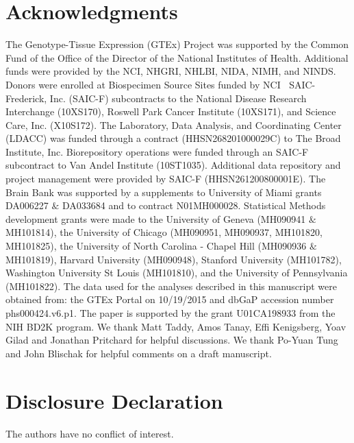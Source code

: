 \documentclass[10pt,letterpaper]{article}
\begin{document}
\section*{Acknowledgments}
The Genotype-Tissue Expression (GTEx) Project was supported by the Common Fund of the Office of the Director of the National Institutes of Health. Additional funds were provided by the NCI, NHGRI, NHLBI, NIDA, NIMH, and NINDS. Donors were enrolled at Biospecimen Source Sites funded by NCI $\ $ SAIC-Frederick, Inc. (SAIC-F) subcontracts to the National Disease Research Interchange (10XS170), Roswell Park Cancer Institute (10XS171), and Science Care, Inc. (X10S172). The Laboratory, Data Analysis, and Coordinating Center (LDACC) was funded through a contract (HHSN268201000029C) to The Broad Institute, Inc. Biorepository operations were funded through an SAIC-F subcontract to Van Andel Institute (10ST1035). Additional data repository and project management were provided by SAIC-F (HHSN261200800001E). The Brain Bank was supported by a supplements to University of Miami grants DA006227 $\&$ DA033684 and to contract N01MH000028. Statistical Methods development grants were made to the University of Geneva (MH090941 $\&$ MH101814), the University of Chicago (MH090951, MH090937, MH101820, MH101825), the University of North Carolina - Chapel Hill (MH090936 $\&$ MH101819), Harvard University (MH090948), Stanford University (MH101782), Washington University St Louis (MH101810), and the University of Pennsylvania (MH101822). The data used for the analyses described in this manuscript were obtained from: the GTEx Portal on 10/19/2015 and  dbGaP accession number phs000424.v6.p1.
The paper is supported by the grant U01CA198933 from the NIH BD2K program. We thank Matt Taddy, Amos Tanay, Effi Kenigsberg, Yoav Gilad and Jonathan Pritchard for helpful discussions. We thank Po-Yuan Tung and John Blischak for helpful comments on a draft manuscript.

\nolinenumbers



\section*{Disclosure Declaration}

The authors have no conflict of interest.

\nolinenumbers



\end{document}
